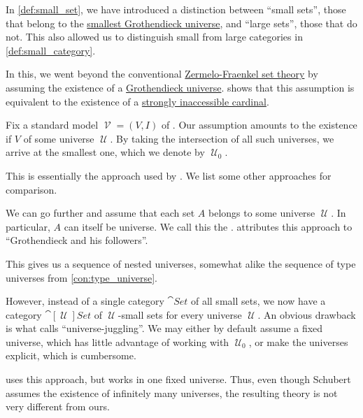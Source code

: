 \begin{remark}\label{rem:small_category}
  In \cref{def:small_set}, we have introduced a distinction between \enquote{small sets}, those that belong to the \hyperref[def:smallest_grothendieck_universe]{smallest Grothendieck universe}, and \enquote{large sets}, those that do not. This also allowed us to distinguish small from large categories in \cref{def:small_category}.

  In this, we went beyond the conventional \hyperref[def:zfc]{Zermelo-Fraenkel set theory} by assuming the existence of a \hyperref[def:grothendieck_universe]{Grothendieck universe}.  shows that this assumption is equivalent to the existence of a \hyperref[rem:strongly_inaccessible_cardinal]{strongly inaccessible cardinal}.

  Fix a standard model \( \mscrV = (V, I) \) of . Our assumption amounts to the existence if \( V \) of some universe \( \mscrU \). By taking the intersection of all such universes, we arrive at the smallest one, which we denote by \( \mscrU_0 \).

  This is essentially the approach used by \textcite[12]{MacLane1971CategoricalAlgebraFoundations}. We list some other approaches for comparison.

  \begin{thmenum}
     We can go further and assume that each set \( A \) belongs to some universe \( \mscrU \). In particular, \( A \) can itself be universe. We call this the . \Textcite[234]{MacLane1971CategoricalAlgebraFoundations} attributes this approach to \enquote{Grothendieck and his followers}.

    This gives us a sequence of nested universes, somewhat alike the sequence of type universes from \cref{con:type_universe}.

    However, instead of a single category \( \cat{Set} \) of all small sets, we now have a category \( \cat[\mscrU]{Set} \) of \( \mscrU \)-small sets for every universe \( \mscrU \). An obvious drawback is what \textcite[22]{Shulman2008SetTheoryForCategoryTheory} calls \enquote{universe-juggling}. We may either by default assume a fixed universe, which has little advantage of working with \( \mscrU_0 \), or make the universes explicit, which is cumbersome.

    \Textcite[\S 3.3]{Schubert1972Categories} uses this approach, but works in one fixed universe. Thus, even though Schubert assumes the existence of infinitely many universes, the resulting theory is not very different from ours.


\end{thmenum}
\end{remark}
